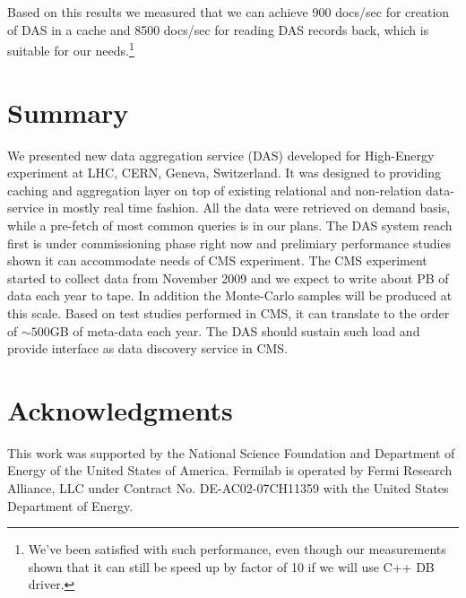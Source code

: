 \documentclass[a4paper]{jpconf}
\begin{document}
Based on this results we measured that we can achieve 900 docs/sec for creation of DAS
in a cache and 8500 docs/sec for reading DAS records back, which is suitable for our
needs.\footnote{We've been satisfied with such performance,
even though our measurements shown that it can still be speed up by factor of
10 if we will use C++ DB driver.}

\section{Summary}
We presented new data aggregation service (DAS) developed for High-Energy experiment
at LHC, CERN, Geneva, Switzerland. It was designed to providing caching and
aggregation layer on top of existing relational and non-relation data-service
in mostly real time fashion. All the data were retrieved on demand basis,
while a pre-fetch of most common queries is in our plans. The DAS system reach
first is under commissioning phase right now and prelimiary performance studies
shown it can accommodate needs of CMS experiment. The CMS experiment started to
collect data from November 2009 and we expect to write about PB of data each
year to tape. In addition the Monte-Carlo samples will be produced at this scale.
Based on test studies performed in CMS, it can translate to the order of
$\sim500$GB of meta-data each year. The DAS should sustain such load and provide
interface as data discovery service in CMS.

\section{Acknowledgments}

This work was supported by the National Science Foundation and Department of Energy of the United States of America. Fermilab is operated by Fermi Research Alliance, LLC under Contract
No. DE-AC02-07CH11359 with the United States Department of Energy.
\end{document}
